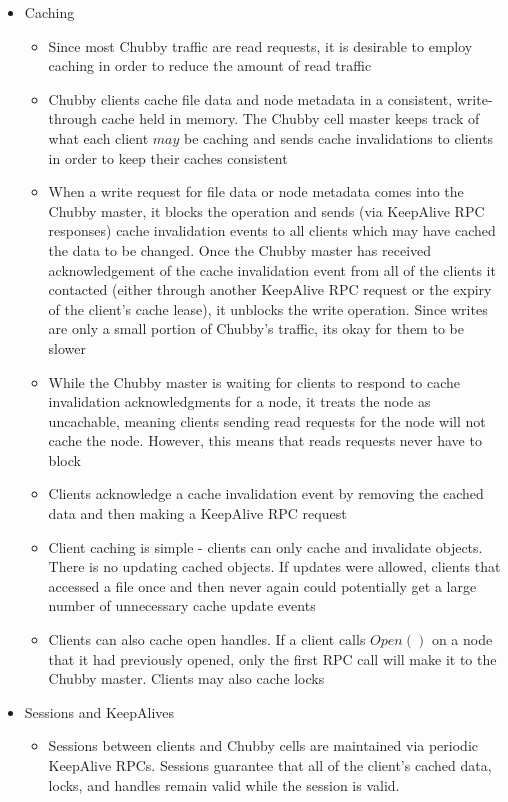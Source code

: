 \documentclass[a4paper]{article}
\begin{document}
\begin{itemize}
\item Caching
\begin{itemize}
\item Since most Chubby traffic are read requests, it is desirable to employ caching in order to reduce the amount of read traffic

\item Chubby clients cache file data and node metadata in a consistent, write-through cache held in memory. The Chubby cell master keeps track of what each client $may$ be caching and sends cache invalidations to clients in order to keep their caches consistent

\item When a write request for file data or node metadata comes into the Chubby master, it blocks the operation and sends (via KeepAlive RPC responses) cache invalidation events to all clients which may have cached the data to be changed. Once the Chubby master has received acknowledgement of the cache invalidation event from all of the clients it contacted (either through another KeepAlive RPC request or the expiry of the client's cache lease), it unblocks the write operation. Since writes are only a small portion of Chubby's traffic, its okay for them to be slower

\item While the Chubby master is waiting for clients to respond to cache invalidation acknowledgments for a node, it treats the node as uncachable, meaning clients sending read requests for the node will not cache the node. However, this means that reads requests never have to block

\item Clients acknowledge a cache invalidation event by removing the cached data and then making a KeepAlive RPC request

\item Client caching is simple - clients can only cache and invalidate objects. There is no updating cached objects. If updates were allowed, clients that accessed a file once and then never again could potentially get a large number of unnecessary cache update events 

\item Clients can also cache open handles. If a client calls $Open()$ on a node that it had previously opened, only the first RPC call will make it to the Chubby master. Clients may also cache locks
\end{itemize}

\item Sessions and KeepAlives
\begin{itemize}
\item Sessions between clients and Chubby cells are maintained via periodic KeepAlive RPCs. Sessions guarantee that all of the client's cached data, locks, and handles remain valid while the session is valid.


\end{itemize}
\end{itemize}
\end{document}
